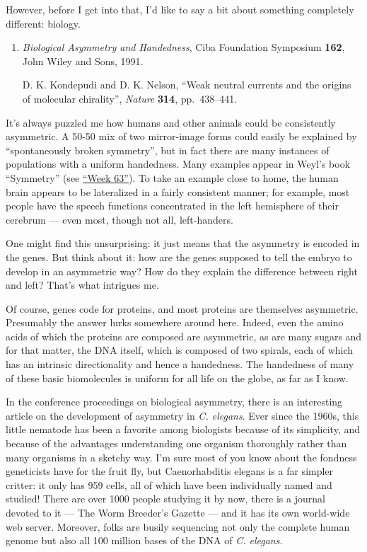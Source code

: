 \documentclass{article}
\begin{document}
However, before I get into that, I'd like to say a bit about something
completely different: biology.

\begin{enumerate}
\def\labelenumi{\arabic{enumi})}
\item
  \emph{Biological Asymmetry and Handedness}, Ciba Foundation Symposium
  \textbf{162}, John Wiley and Sons, 1991.

  D. K. Kondepudi and D. K. Nelson, ``Weak neutral currents and the
  origins of molecular chirality'', \emph{Nature} \textbf{314},
  pp.~438--441.
\end{enumerate}

It's always puzzled me how humans and other animals could be
consistently asymmetric. A 50-50 mix of two mirror-image forms could
easily be explained by ``spontaneously broken symmetry'', but in fact
there are many instances of populations with a uniform handedness. Many
examples appear in Weyl's book ``Symmetry'' (see
\protect\hyperlink{week63}{``Week 63''}). To take an example close to
home, the human brain appears to be lateralized in a fairly consistent
manner; for example, most people have the speech functions concentrated
in the left hemisphere of their cerebrum --- even most, though not all,
left-handers.

One might find this unsurprising: it just means that the asymmetry is
encoded in the genes. But think about it: how are the genes supposed to
tell the embryo to develop in an asymmetric way? How do they explain the
difference between right and left? That's what intrigues me.

Of course, genes code for proteins, and most proteins are themselves
asymmetric. Presumably the answer lurks somewhere around here. Indeed,
even the amino acids of which the proteins are composed are asymmetric,
as are many sugars and for that matter, the DNA itself, which is
composed of two spirals, each of which has an intrinsic directionality
and hence a handedness. The handedness of many of these basic
biomolecules is uniform for all life on the globe, as far as I know.

In the conference proceedings on biological asymmetry, there is an
interesting article on the development of asymmetry in \emph{C.
elegans}. Ever since the 1960s, this little nematode has been a favorite
among biologists because of its simplicity, and because of the
advantages understanding one organism thoroughly rather than many
organisms in a sketchy way. I'm sure most of you know about the fondness
geneticists have for the fruit fly, but Caenorhabditis elegans is a far
simpler critter: it only has 959 cells, all of which have been
individually named and studied! There are over 1000 people studying it
by now, there is a journal devoted to it --- The Worm Breeder's Gazette
--- and it has its own world-wide web server. Moreover, folks are busily
sequencing not only the complete human genome but also all 100 million
bases of the DNA of \emph{C. elegans}.
\end{document}
